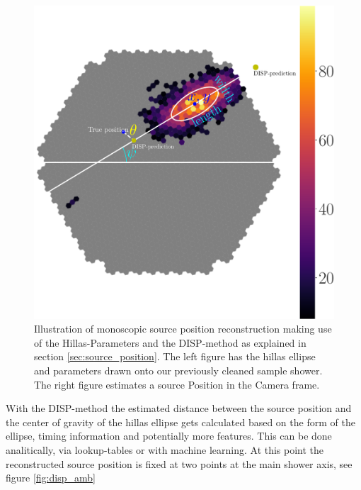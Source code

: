 \begin{figure}
    \includegraphics[width=0.9\linewidth]{Plots/hillas_complete.pdf}
    \caption{Illustration of monoscopic source position reconstruction making use of 
        the Hillas-Parameters and the DISP-method as explained in section \ref{sec:source_position}.
        The left figure has the hillas ellipse and parameters drawn onto our previously cleaned sample shower.
        The right figure estimates a source Position in the Camera frame.}
    \label{fig:disp}
\end{figure}

With the DISP-method the estimated distance between the source
position and the center of gravity of the hillas ellipse gets calculated
based on the form of the ellipse, timing information and potentially
more features.
This can be done analitically, via lookup-tables or with machine learning.
At this point the reconstructed source position
is fixed at two points at the main shower axis, see figure \ref{fig:disp_amb}


